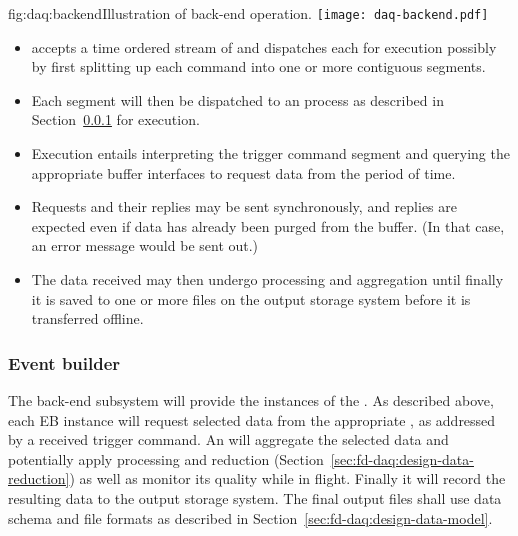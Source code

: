 \begin{dunefigure}{fig:daq:backend}{Illustration of   back-end operation.}
  \texttt{[image: daq-backend.pdf]}
\end{dunefigure}

\begin{itemize}
\item {} accepts a time ordered stream of  and dispatches each for execution possibly by first splitting up each command into one or more contiguous segments.
\item Each segment will then be dispatched to an  process as described in Section~\ref{sec:fd-daq:design-event-builder} for execution.
\item Execution entails interpreting the trigger command segment and querying the appropriate  buffer interfaces to request data from the period of time. 
\item Requests and their replies may be sent synchronously, and
  replies are expected even if data has already been purged from the
   buffer. (In that case, an error message would be sent out.)
\item The data received may then undergo processing and aggregation
  until finally it is saved to one or more files on the output storage
  system before it is transferred offline.
\end{itemize}



\subsubsection{Event builder}
\label{sec:fd-daq:design-event-builder}

The  back-end subsystem will provide the instances of the .
As described above, each EB instance will request selected data from
the appropriate , as addressed by a received trigger command. 
An  will aggregate the selected data and potentially apply processing and reduction (Section~\ref{sec:fd-daq:design-data-reduction}) as well as monitor its quality while in flight.
Finally it will record the resulting data to the output storage system.
The final output files shall use data schema and file formats as described in Section~\ref{sec:fd-daq:design-data-model}.



